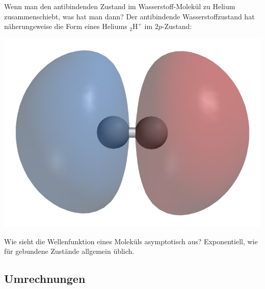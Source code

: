

\begin{fquestion}{Wenn man den antibindenden Zustand im Wasserstoff-Molekül zu Helium zusammenschiebt, was hat man dann?}
    Der antibindende Wasserstoffzustand hat näherungsweise die Form eines Heliums ${}_{2}\text{H}^+$ im $2p$-Zustand:
    \begin{center}
        \includegraphics[width=0.3\linewidth]{img/800px-Dihydrogen-LUMO-phase-3D-balls.png}
    \end{center}
\end{fquestion}


\begin{fquestion}{Wie sieht die Wellenfunktion eines Moleküls asymptotisch aus?}
    Exponentiell, wie für gebundene Zustände allgemein üblich.
\end{fquestion}


\subsection{Umrechnungen}

